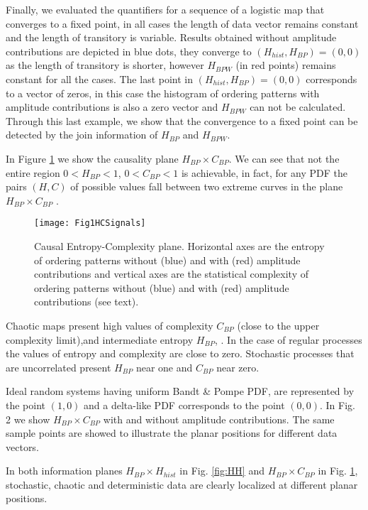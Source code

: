 Finally, we evaluated the quantifiers for a sequence of a logistic map that converges to a fixed point, in all cases the length of data vector remains constant and the length of transitory is variable.
Results obtained without amplitude contributions are depicted in blue dots, they converge to $(H_{hist}, H_{BP})=(0, 0)$ as the length of transitory is shorter, however $H_{BPW}$ (in red points) remains constant for all the cases.
The last point in $(H_{hist}, H_{BP})=(0, 0)$ corresponds to a vector of zeros, in this case the histogram of ordering patterns with amplitude contributions is also a zero vector and $H_{BPW}$ can not be calculated.
Through this last example, we show that the convergence to a fixed point can be detected by the join information of $H_{BP}$ and $H_{BPW}$.

In Figure \ref{fig:HC} we show the causality plane $H_{BP} \times C_{BP}$.
We can see that not the entire region $0<H_{BP}<1$, $0<C_{BP}<1$ is achievable, in fact, for any PDF the pairs $(H,C)$ of possible values fall between two extreme curves in the plane $H_{BP} \times C_{BP}$ \cite{Anteneodo1996}.
\begin{figure}[htpb]
	\centering		
	\texttt{[image: Fig1HCSignals]}
	\caption{Causal Entropy-Complexity plane. Horizontal axes are the entropy of ordering patterns without (blue) and with (red) amplitude contributions and vertical axes are the statistical complexity of ordering patterns without (blue) and with (red) amplitude contributions (see text).}
	\label{fig:HC}
\end{figure}

Chaotic maps present high values of complexity $C_{BP}$ (close to the upper complexity limit),and intermediate entropy $H_{BP}$, \cite{Rosso2007,Olivares2012}.
In the case of regular processes the values of entropy and complexity are close to zero. 
Stochastic processes that are uncorrelated present $H_{BP}$ near one and $C_{BP}$ near zero.

Ideal random systems having uniform Bandt \& Pompe PDF, are represented by the point $(1,0)$ \cite{Gonzalez2005} and a delta-like PDF corresponds to the point $(0,0)$.
In Fig. 2 we show $H_{BP} \times C_{BP}$ with and without amplitude contributions.
The same sample points are showed to illustrate the planar positions for different data vectors.

In both information planes $H_{BP} \times H_{hist}$ in Fig. \ref{fig:HH} and $H_{BP} \times C_{BP}$ in Fig. \ref{fig:HC}, stochastic, chaotic and deterministic data are clearly localized at different planar positions.

